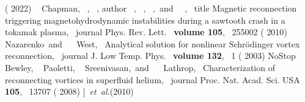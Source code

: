 \documentclass[%
 reprint,
unsortedaddress,
 amsmath,amssymb,
 aps,
 prl,
]{revtex4-2}
\begin{document}
\begin{thebibliography}{38}
{	  ( {2022})}%
	  \BibitemOpen
	   { {\ \bibnamefont
	  {Chapman}},  {~},
	   {\ }, \bibinfo
	  {author} {\ }, 
	  {\ }, 
	  {~},\ and\ 
	  {~},\ } {\bibinfo
	  {title} {Magnetic reconnection triggering magnetohydrodynamic instabilities
	  during a sawtooth crash in a tokamak plasma},\ }\href@noop {} {\bibfield
	  {journal} { {Phys. Rev. Lett.}\ }\textbf {\bibinfo
	  {volume} {105}},\  {255002} (
	  {2010})}%
	  \BibitemOpen
	   { {~\bibnamefont
	  {Nazarenko}}\ and\  {~\bibnamefont
	  {West}},\ } { {Analytical solution for
	  nonlinear {Schr{\"o}dinger} vortex reconnection},\ }\href@noop {} {\bibfield
	  {journal} { {J. Low Temp. Phys.}\ }\textbf {\bibinfo
	  {volume} {132}},\  {1} ( {2003})}\BibitemShut
	  {NoStop}%
	  \BibitemOpen
	   { {\ \bibnamefont
	  {Bewley}},  {\ \bibnamefont
	  {Paoletti}},  {\ \bibnamefont
	  {Sreenivasan}},\ and\  {\ \bibnamefont
	  {Lathrop}},\ } { {Characterization of
	  reconnecting vortices in superfluid helium},\ }\href@noop {} {\bibfield
	  {journal} { {Proc. Nat. Acad. Sci. USA}\ }\textbf
	  { {105}},\  {13707} (
	  {2008})}%
	\bibitem [{\ \emph {et~al.}(2010)\citenamefont
}
\end{thebibliography}
\end{document}
